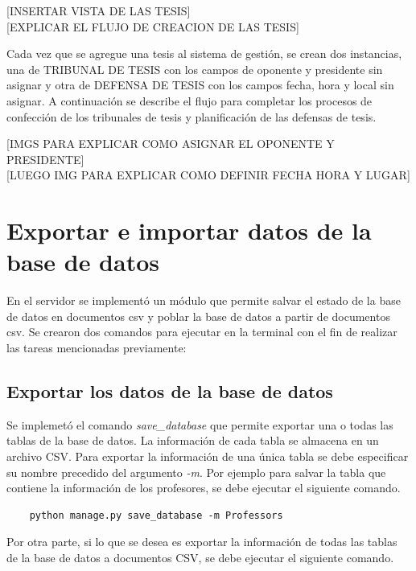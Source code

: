 [INSERTAR VISTA DE LAS TESIS] \\

[EXPLICAR EL FLUJO DE CREACION DE LAS TESIS]

Cada vez que se agregue una tesis al sistema de gestión, se crean dos instancias, 
una de TRIBUNAL DE TESIS con los campos de oponente y presidente sin asignar y otra 
de DEFENSA DE TESIS con los campos fecha, hora y local sin asignar. A continuación 
se describe el flujo para completar los procesos de confección de los tribunales de tesis
y planificación de las defensas de tesis.

[IMGS PARA EXPLICAR COMO ASIGNAR EL OPONENTE Y PRESIDENTE] \\

[LUEGO IMG PARA EXPLICAR COMO DEFINIR FECHA HORA Y LUGAR]





\section{Exportar e importar datos de la base de datos}

En el servidor se implementó un módulo 
que permite salvar el estado de la base de datos 
en documentos csv y poblar la base de datos a partir de documentos csv.
Se crearon dos comandos para ejecutar en la terminal con el 
fin de realizar las tareas mencionadas previamente:

\subsection{Exportar los datos de la base de datos}

Se implemetó el comando \textit{save\_database}
que permite exportar una o todas las tablas de la base de datos.
La información de cada tabla se almacena en un archivo CSV.
Para exportar la información de una única tabla
se debe especificar su nombre precedido del argumento \textit{-m}. Por 
ejemplo para salvar la tabla que contiene la información de los profesores, se debe 
ejecutar el siguiente comando.

\begin{verbatim}
    python manage.py save_database -m Professors
\end{verbatim}


Por otra parte, si lo que se desea es exportar la información de todas las tablas 
de la base de datos a documentos CSV, se debe ejecutar el siguiente comando.

